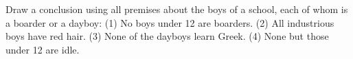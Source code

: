 Draw a conclusion using all premises about the boys of a school, each of whom is a boarder or a dayboy: (1) No boys under 12 are boarders. (2) All industrious boys have red hair. (3) None of the dayboys learn Greek. (4) None but those under 12 are idle.
